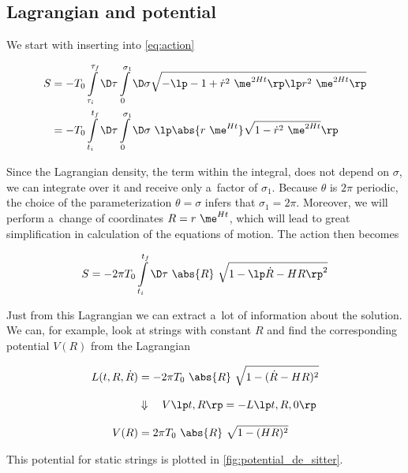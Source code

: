 \subsection{Lagrangian and potential}

We start with inserting  into \cref{eq:action}

\begin{equation}
    \begin{aligned}
        S &= -T_0 \int\limits_{\tau_i}^{\tau_f} \D \tau \int\limits_{0}^{\sigma_1} \D \sigma 
        \sqrt{ - \lp -1 + \dot{r}^2 ~ \me^{2Ht} \rp \lp r^2 ~ \me^{2Ht} \rp}\\ 
        &= -T_0 \int\limits_{t_i}^{t_f} \D \tau \int\limits_{0}^{\sigma_1} \D \sigma ~
        \lp \abs{r ~ \me^{Ht}} \sqrt{1 - \dot{r}^2 ~ \me^{2Ht}} \rp
    \end{aligned}
\end{equation}

\noindent
Since the Lagrangian density, the term within the integral, does not depend on $\sigma$, we can integrate over it and receive only a~factor of $\sigma_1$. Because $\theta$ is $2 \pi$ periodic, the choice of the parameterization $\theta = \sigma$ infers that $\sigma_1 = 2 \pi$. Moreover, we will perform a~change of coordinates $R = r ~ \me^{Ht}$, which will lead to great simplification in calculation of the equations of motion. The action then becomes

\begin{equation}
\label{eq:action_de_sitter}
    S = - 2 \pi T_0 \int\limits_{t_i}^{t_f} \D \tau ~
    \abs{R} ~ \sqrt{1 - \lp \dot{R} - HR \rp^2}
\end{equation}

\noindent
Just from this Lagrangian we can extract a~lot of information about the solution. We can, for example, look at strings with constant $R$ and find the corresponding potential $V(R)$ from the Lagrangian \cite{zwiebach}

\begin{align}
    L (t, R, \dot{R} ) & = - 2 \pi T_0 ~ \abs{R} ~ \sqrt{1 - ( \dot{R} - HR )^2} \label{eq:desiter_lagrangian} \\[8pt]
    & \Downarrow \quad V \lp t, R \rp = -L \lp t, R, 0 \rp \nonumber \\[8pt]
    V(R) & = 2 \pi T_0 ~ \abs{R} ~ \sqrt{1 - ( HR )^2}
\end{align}
\vspace{0mm}


\noindent
This potential for static strings is plotted in \cref{fig:potential_de_sitter}. 

